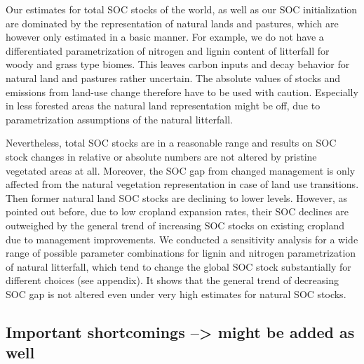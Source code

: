 \documentclass[gc, manuscript]{copernicus}
\begin{document}
Our estimates for total SOC stocks of the world, as well as our SOC initialization are dominated by the representation of natural lands and pastures, which are however only estimated in a basic manner. For example, we do not have a differentiated parametrization of nitrogen and lignin content of litterfall for woody and grass type biomes. This leaves carbon inputs and decay behavior for natural land and pastures rather uncertain. The absolute values of stocks and emissions from land-use change therefore have to be used with caution. Especially in less forested areas the natural land representation might be off, due to parametrization assumptions of the natural litterfall.

Nevertheless, total SOC stocks are in a reasonable range and results on SOC stock changes in relative or absolute numbers are not altered by pristine vegetated areas at all. Moreover, the SOC gap from changed management is only affected from the natural vegetation representation in case of land use transitions. Then former natural land SOC stocks are declining to lower levels. However, as pointed out before, due to low cropland expansion rates, their SOC declines are outweighed by the general trend of increasing SOC stocks on existing cropland due to management improvements.
We conducted a sensitivity analysis for a wide range of possible parameter combinations for lignin and nitrogen parametrization of natural litterfall, which tend to change the global SOC stock substantially for different choices
(see appendix). It shows that the general trend of decreasing SOC gap is not altered even under very high estimates for natural SOC stocks.

\hypertarget{important-shortcomings-might-be-added-as-well}{%
\subsection{Important shortcomings --\textgreater{} might be added as well}\label{important-shortcomings-might-be-added-as-well}}
\end{document}
